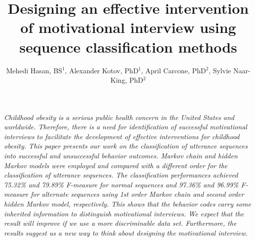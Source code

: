 \documentclass{amia}
\begin{document}
\title{Designing an effective intervention of motivational interview using sequence classification methods}

\author{Mehedi Hasan, BS$^{1}$, Alexander Kotov, PhD$^{1}$, April Carcone, PhD$^{2}$, Sylvie Naar-King, PhD$^{2}$}


\maketitle

\textit{Childhood obesity is a serious public health concern in the United States and worldwide. Therefore, there is a need for identification of successful motivational interviews to facilitate the development of effective interventions for childhood obesity. This paper presents our work on the classification of utterance sequences into successful and unsuccessful behavior outcomes. Markov chain and hidden Markov models were employed and compared with a different order for the classification of utterance sequences. The classification performances achieved 75.32\% and 79.89\% F-measure for normal sequences and 97.36\% and 96.99\% F-measure for alternate sequences using 1st order Markov chain and second order hidden Markov model, respectively. This shows that the behavior codes carry some inherited information to distinguish motivational interviews. We expect that the result will improve if we use a more discriminable data set. Furthermore, the results suggest us a new way to think about designing the motivational interview.}
\end{document}
